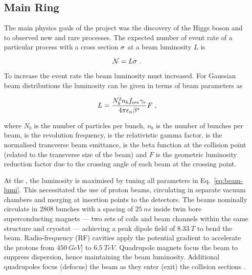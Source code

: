 \begin{figure}[!htbp]
    \centering
    \caption{\cite{Mobs:2197559}}
    \label{fig:LHC-Complex}
\end{figure}

\subsection{\LHC Main Ring}

The main physics goals of the \LHC project was the discovery of the Higgs boson
and to observed new and \SM rare processes. The expected number of event rate of
a particular process with a cross section $\sigma$ at a beam luminosity
$L$ is

\begin{equation}
    \mathcal{N} = L \sigma \ .
\end{equation}

To increase the event rate the beam luminosity must increased. For Gaussian
beam distributions the luminosity can be given in terms of beam parameters as

\begin{equation}
    \label{eq:beam-lumi}
    L = \frac{N_b^2 n_b\frev\relgamma}{4\pi\emitt\bstar} F\ ,
\end{equation}

where $N_b$ is the number of particles per bunch, $n_b$ is the number of bunches
per beam, \frev is the revolution frequency, \relgamma is the relativistic gamma
factor, \emitt is the normalised transverse beam emittance, \bstar is the beta
function at the collision point (related to the transverse size of the beam) and
$F$ is the geometric luminosity reduction factor due to the crossing angle of
each beam at the crossing point.

At the \LHC, the luminosity is maximised by tuning all parameters in
Eq.~\eqref{eq:beam-lumi}. This necessitated the use of proton beams, circulating
in separate vacuum chambers and merging at insertion points to the detectors.
The beams nominally circulate in 2808 bunches with a spacing of ${\SI{25}{ns}}$
inside twin bore superconducting magnets --- two sets of coils and beam channels
within the same structure and cryostat --- achieving a peak dipole field of
${\SI{8.33}{T}}$ to bend the beam. Radio-frequency (RF) cavities apply the
potential gradient to accelerate the protons from ${\SI{450}{GeV}]}$ to
${\SI{6.5}{TeV}}$. Quadrupole magnets focus the beam to suppress dispersion,
hence maintaining the beam luminosity. Additional quadrupoles focus (defocus)
the beam as they enter (exit) the collision sections \cite{Bruning:782076}.

